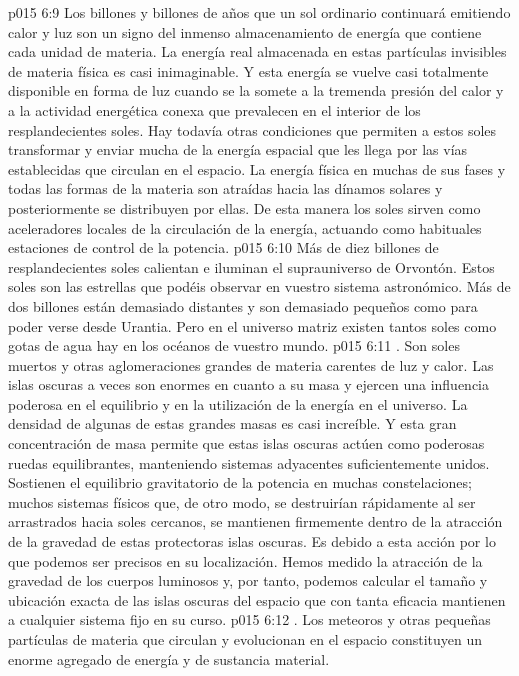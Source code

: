 \vs p015 6:9 Los billones y billones de años que un sol ordinario continuará emitiendo calor y luz son un signo del inmenso almacenamiento de energía que contiene cada unidad de materia. La energía real almacenada en estas partículas invisibles de materia física es casi inimaginable. Y esta energía se vuelve casi totalmente disponible en forma de luz cuando se la somete a la tremenda presión del calor y a la actividad energética conexa que prevalecen en el interior de los resplandecientes soles. Hay todavía otras condiciones que permiten a estos soles transformar y enviar mucha de la energía espacial que les llega por las vías establecidas que circulan en el espacio. La energía física en muchas de sus fases y todas las formas de la materia son atraídas hacia las dínamos solares y posteriormente se distribuyen por ellas. De esta manera los soles sirven como aceleradores locales de la circulación de la energía, actuando como habituales estaciones de control de la potencia.
\vs p015 6:10 Más de diez billones de resplandecientes soles calientan e iluminan el suprauniverso de Orvontón. Estos soles son las estrellas que podéis observar en vuestro sistema astronómico. Más de dos billones están demasiado distantes y son demasiado pequeños como para poder verse desde Urantia. Pero en el universo matriz existen tantos soles como gotas de agua hay en los océanos de vuestro mundo.
\vs p015 6:11 \pc {}. Son soles muertos y otras aglomeraciones grandes de materia carentes de luz y calor. Las islas oscuras a veces son enormes en cuanto a su masa y ejercen una influencia poderosa en el equilibrio y en la utilización de la energía en el universo. La densidad de algunas de estas grandes masas es casi increíble. Y esta gran concentración de masa permite que estas islas oscuras actúen como poderosas ruedas equilibrantes, manteniendo sistemas adyacentes suficientemente unidos. Sostienen el equilibrio gravitatorio de la potencia en muchas constelaciones; muchos sistemas físicos que, de otro modo, se destruirían rápidamente al ser arrastrados hacia soles cercanos, se mantienen firmemente dentro de la atracción de la gravedad de estas protectoras islas oscuras. Es debido a esta acción por lo que podemos ser precisos en su localización. Hemos medido la atracción de la gravedad de los cuerpos luminosos y, por tanto, podemos calcular el tamaño y ubicación exacta de las islas oscuras del espacio que con tanta eficacia mantienen a cualquier sistema fijo en su curso.
\vs p015 6:12 \pc {}. Los meteoros y otras pequeñas partículas de materia que circulan y evolucionan en el espacio constituyen un enorme agregado de energía y de sustancia material.
